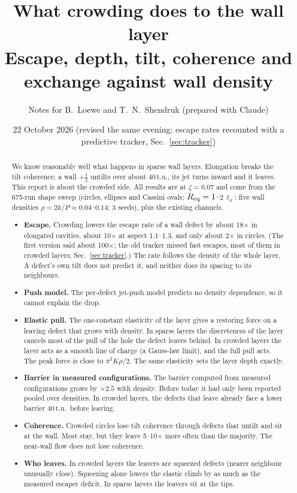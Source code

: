 \documentclass[11pt,a4paper]{article}
\title{What crowding does to the wall layer\\[2pt]\large Escape, depth, tilt, coherence and exchange against wall density}
\author{Notes for B.~Loewe and T.~N.~Shendruk (prepared with Claude)}
\date{22 October 2026 (revised the same evening: escape rates recounted with a predictive tracker, Sec.~\ref{sec:tracker})}
\newcommand{\half}{\tfrac12}
\newcommand{\la}{\ell_a}
\begin{document}
\maketitle

\begin{abstract}
We know reasonably well what happens in sparse wall layers. Elongation breaks the tilt coherence; a wall $+\half$ untilts over about 40\,t.u., its
jet turns inward and it leaves. This report is about the crowded side. All results are at $\zeta=0.07$ and come from the 675-run shape sweep
(circles, ellipses and Cassini ovals; $R_{\rm eq}=1$--$2\,\la$; five wall densities $\rho=2k/P\approx0.04$--$0.14$; 3 seeds), plus the existing channels.

\begin{itemize}
\item \textbf{Escape.} Crowding lowers the escape rate of a wall defect by about 18$\times$ in elongated cavities, about 10$\times$ at aspect 1.1--1.3, and only about 2$\times$ in circles. (The first version said about 100$\times$; the old tracker missed fast escapes, most of them in crowded layers; Sec.~\ref{sec:tracker}.) The rate follows the density of the whole layer. A defect's own tilt does not predict it, and neither does its spacing to its neighbours.
\item \textbf{Push model.} The per-defect jet-push model predicts no density dependence, so it cannot explain the drop.
\item \textbf{Elastic pull.} The one-constant elasticity of the layer gives a restoring force on a leaving defect that grows with density. In sparse layers the discreteness of the layer cancels most of the pull of the hole the defect leaves behind. In crowded layers the layer acts as a smooth line of charge (a Gauss-law limit), and the full pull acts. The peak force is close to $\pi^2K\rho/2$. The same elasticity sets the layer depth exactly.
\item \textbf{Barrier in measured configurations.} The barrier computed from measured configurations grows by $\times2.5$ with density. Before today it had only been reported pooled over densities. In crowded layers, the defects that leave already face a lower barrier 40\,t.u.\ before leaving.
\item \textbf{Coherence.} Crowded circles lose tilt coherence through defects that untilt and sit at the wall. Most stay, but they leave 5--10$\times$ more often than the majority. The near-wall flow does not lose coherence.
\item \textbf{Who leaves.} In crowded layers the leavers are squeezed defects (nearer neighbour unusually close). Squeezing alone lowers the elastic climb by as much as the measured escaper deficit. In sparse layers the leavers sit at the tips.

\end{itemize}
\end{abstract}
\end{document}
